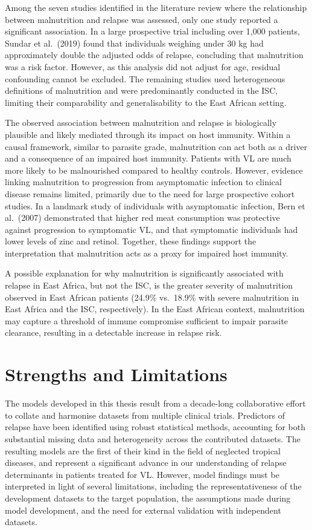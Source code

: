 Among the seven studies identified in the literature review where the relationship between malnutrition and relapse was assessed, only one study reported a significant association. In a large prospective trial including over 1,000 patients, Sundar et al.\ (2019) found that individuals weighing under 30 kg had approximately double the adjusted odds of relapse, concluding that malnutrition was a risk factor\cite{sundar2019}. However, as this analysis did not adjust for age, residual confounding cannot be excluded. The remaining studies used heterogeneous definitions of malnutrition and were predominantly conducted in the ISC, limiting their comparability and generalisability to the East African setting.

The observed association between malnutrition and relapse is biologically plausible and likely mediated through its impact on host immunity. Within a causal framework, similar to parasite grade, malnutrition can act both as a driver and a consequence of an impaired host immunity\cite{bourke2016}. Patients with VL are much more likely to be malnourished compared to healthy controls\cite{burza2018,pareyn2025}. However, evidence linking malnutrition to progression from asymptomatic infection to clinical disease remains limited, primarily due to the need for large prospective cohort studies\cite{hirve2016,picado2014}. In a landmark study of individuals with asymptomatic infection, Bern et al.\ (2007) demonstrated that higher red meat consumption was protective against progression to symptomatic VL, and that symptomatic individuals had lower levels of zinc and retinol\cite{bern2007}. Together, these findings support the interpretation that malnutrition acts as a proxy for impaired host immunity.

A possible explanation for why malnutrition is significantly associated with relapse in East Africa, but not the ISC, is the greater severity of malnutrition observed in East African patients (24.9\% vs.\ 18.9\% with severe malnutrition in East Africa and the ISC, respectively). In the East African context, malnutrition may capture a threshold of immune compromise sufficient to impair parasite clearance, resulting in a detectable increase in relapse risk.

\section{Strengths and Limitations}

The models developed in this thesis result from a decade-long collaborative effort to collate and harmonise datasets from multiple clinical trials. Predictors of relapse have been identified using robust statistical methods, accounting for both substantial missing data and heterogeneity across the contributed datasets. The resulting models are the first of their kind in the field of neglected tropical diseases, and represent a significant advance in our understanding of relapse determinants in patients treated for VL. However, model findings must be interpreted in light of several limitations, including the representativeness of the development datasets to the target population, the assumptions made during model development, and the need for external validation with independent datasets.

